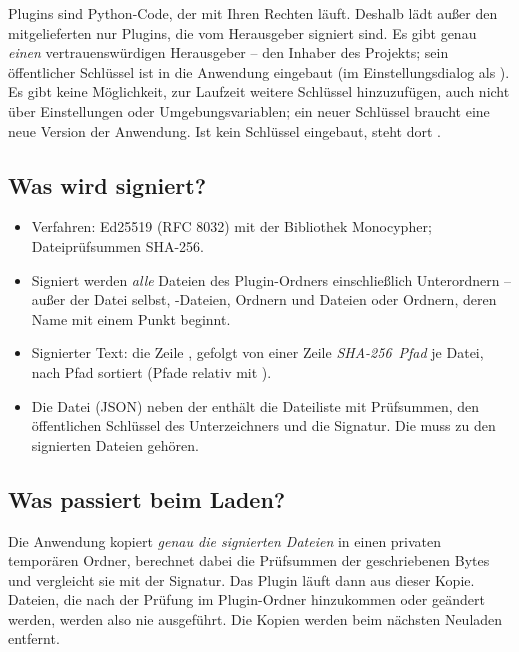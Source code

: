 Plugins sind Python-Code, der mit Ihren Rechten läuft. Deshalb lädt \produkt{} außer den
mitgelieferten nur Plugins, die vom Herausgeber signiert sind. Es gibt genau \emph{einen}
vertrauenswürdigen Herausgeber – den Inhaber des Projekts; sein öffentlicher Schlüssel ist in die
Anwendung eingebaut (im Einstellungsdialog als ). Es gibt
keine Möglichkeit, zur Laufzeit weitere Schlüssel hinzuzufügen, auch nicht über Einstellungen oder
Umgebungsvariablen; ein neuer Schlüssel braucht eine neue Version der Anwendung. Ist kein
Schlüssel eingebaut, steht dort .

\subsection{Was wird signiert?}

\begin{itemize}
  \item Verfahren: Ed25519 (RFC 8032) mit der Bibliothek Monocypher; Dateiprüfsummen SHA-256.
  \item Signiert werden \emph{alle} Dateien des Plugin-Ordners einschließlich Unterordnern –
        außer der Datei  selbst, -Dateien, Ordnern
         und Dateien oder Ordnern, deren Name mit einem Punkt beginnt.
  \item Signierter Text: die Zeile , gefolgt von einer Zeile
        \textit{SHA-256}~\textit{Pfad} je Datei, nach Pfad sortiert (Pfade relativ mit
        \code{/}).
  \item Die Datei  (JSON) neben der  enthält die Dateiliste mit
        Prüfsummen, den öffentlichen Schlüssel des Unterzeichners und die Signatur. Die
         muss zu den signierten Dateien gehören.
\end{itemize}

\subsection{Was passiert beim Laden?}

Die Anwendung kopiert \emph{genau die signierten Dateien} in einen privaten temporären Ordner,
berechnet dabei die Prüfsummen der geschriebenen Bytes und vergleicht sie mit der Signatur. Das
Plugin läuft dann aus dieser Kopie. Dateien, die nach der Prüfung im Plugin-Ordner hinzukommen oder
geändert werden, werden also nie ausgeführt. Die Kopien werden beim nächsten Neuladen entfernt.

